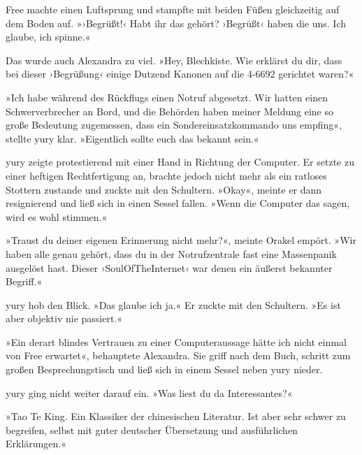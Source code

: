 
Free machte einen Luftsprung und stampfte mit beiden Füßen gleichzeitig auf dem Boden auf. »›Begrüßt!‹ Habt ihr das gehört? ›Begrüßt‹ haben die uns. Ich glaube, ich spinne.«

Das wurde auch Alexandra zu viel. »Hey, Blechkiste. Wie erklärst du dir, dass bei dieser ›Begrüßung‹ einige Dutzend Kanonen auf die 4-6692 gerichtet waren?«


»Ich habe während des Rückflugs einen Notruf abgesetzt. Wir hatten einen Schwerverbrecher an Bord, und die Behörden haben meiner Meldung eine so große Bedeutung zugemessen, dass ein Sondereinsatzkommando uns empfing«, stellte yury klar. »Eigentlich sollte euch das bekannt sein.«


yury zeigte protestierend mit einer Hand in Richtung der Computer. Er setzte zu einer heftigen Rechtfertigung an, brachte jedoch nicht mehr als ein ratloses Stottern zustande und zuckte mit den Schultern. »Okay«, meinte er dann resignierend und ließ sich in einen Sessel fallen. »Wenn die Computer das sagen, wird es wohl stimmen.«

»Traust du deiner eigenen Erinnerung nicht mehr?«, meinte Orakel empört. »Wir haben alle genau gehört, dass du in der Notrufzentrale fast eine Massenpanik ausgelöst hast. Dieser ›SoulOfTheInternet‹ war denen ein äußerst bekannter Begriff.«

yury hob den Blick. »Das glaube ich ja.« Er zuckte mit den Schultern. »Es ist aber objektiv nie passiert.«

»Ein derart blindes Vertrauen zu einer Computeraussage hätte ich nicht einmal von Free erwartet«, behauptete Alexandra. Sie griff nach dem Buch, schritt zum großen Besprechungstisch und ließ sich in einem Sessel neben yury nieder.

yury ging nicht weiter darauf ein. »Was liest du da Interessantes?«

»Tao Te King. Ein Klassiker der chinesischen Literatur. Ist aber sehr schwer zu begreifen, selbst mit guter deutscher Übersetzung und ausführlichen Erklärungen.«

